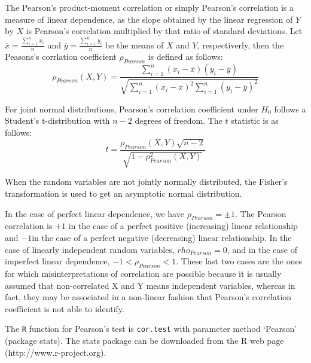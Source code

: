 \documentclass[a4paper]{article}
\begin{document}
The Pearson's product-moment correlation or simply Pearson's correlation is a measure of linear dependence, as the slope obtained by the linear regression of $Y$ by $X$ is Pearson's correlation multiplied by that ratio of standard deviations.
Let $\overline{x} = \frac{\sum_{i=1}^{n} x_{i}}{n}$ and $\overline{y} = \frac{\sum_{i=1}^{n} y_{i}}{n}$ be the means of $X$ and $Y$, respectiverly, then the Peasons's corrlation coefficient $\rho_{Pearson}$ is defined as follows: 
\begin{equation}
\rho_{Pearson}(X, Y) = \frac{\sum_{i=1}^{n}(x_{i} - \overline{x})(y_{i} - \overline{y})}
{\sqrt{\sum_{i=1}^{n}(x_{i} - \overline{x})^2  \sum_{i=1}^{n}(y_{i} - \overline{y})^2}}
\end{equation}


For joint normal distributions, Pearson's correlation coefficient under $H_{0}$ follows a Student's t-distribution with $n-2$ degrees of freedom. The $t$ statistic is as follows:
\begin{equation}
t = \frac{\rho_{Pearson}(X, Y) \sqrt{n -2}}{\sqrt{1- \rho^{2}_{Pearson}(X, Y)}}
\end{equation}

When the random variables are not jointly normally distributed, the Fisher's transformation is used to get an asymptotic normal distribution.

In the case of perfect linear dependence, we have $\rho_{Pearson} = \pm1$. The Pearson correlation is $+1$ in the case of a perfect positive (increasing) linear relationship and $-1 $in the case of a perfect negative (decreasing) linear relationship. In the case of linearly independent random variables, $rho_{Pearson} = 0$, and in the case of imperfect linear dependence, $-1 < \rho_{Pearson} < 1$. These last two cases are the ones for which misinterpretations of correlation are possible because it is usually assumed that non-correlated X and Y means independent variables, whereas in fact, they may be associated in a non-linear fashion that Pearson's correlation coefficient is not able to identify.

The \texttt{R} function for Pearson's test is \texttt{cor.test} with parameter method `Pearson' (package stats). The stats package can be downloaded from the R web page (http://www.r-project.org).
\end{document}
